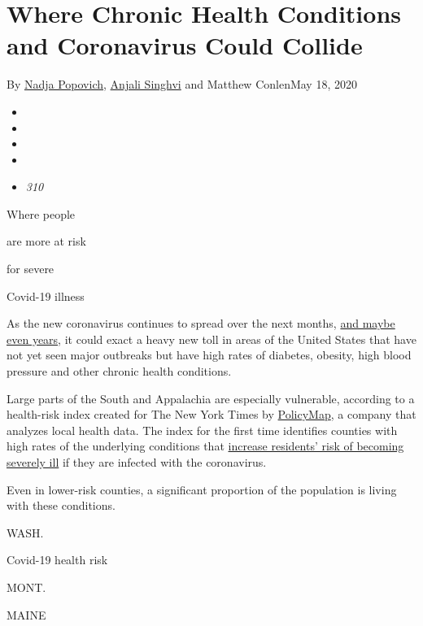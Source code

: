 \hypertarget{where-chronic-health-conditions-and-coronavirus-could-collide}{%
\section{Where Chronic Health Conditions and Coronavirus Could
Collide}\label{where-chronic-health-conditions-and-coronavirus-could-collide}}

By \href{https://www.nytimes3xbfgragh.onion/by/nadja-popovich}{Nadja
Popovich},
\href{https://www.nytimes3xbfgragh.onion/by/anjali-singhvi}{Anjali
Singhvi} and Matthew ConlenMay 18, 2020

\begin{itemize}
\item
\item
\item
\item
\item
  \emph{310}
\end{itemize}

Where people

are more at risk

for severe

Covid-19 illness

As the new coronavirus continues to spread over the next months,
\href{https://www.nytimes3xbfgragh.onion/interactive/2020/04/30/opinion/coronavirus-covid-vaccine.html}{and
maybe even years}, it could exact a heavy new toll in areas of the
United States that have not yet seen major outbreaks but have high rates
of diabetes, obesity, high blood pressure and other chronic health
conditions.

Large parts of the South and Appalachia are especially vulnerable,
according to a health-risk index created for The New York Times by
\href{https://www.policymap.com/2020/05/policymap-covid19-quick-maps/}{PolicyMap},
a company that analyzes local health data. The index for the first time
identifies counties with high rates of the underlying conditions that
\href{https://www.cdc.gov/mmwr/volumes/69/wr/mm6915e3.htm}{increase
residents' risk of becoming severely ill} if they are infected with the
coronavirus.

Even in lower-risk counties, a significant proportion of the population
is living with these conditions.

WASH.

Covid-19 health risk

MONT.

MAINE

